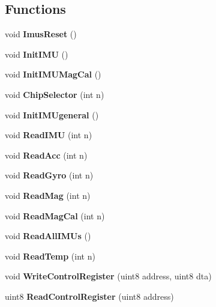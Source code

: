 \subsection*{Functions}
\begin{DoxyCompactItemize}
\item 
\mbox{\label{_i_m_u__functions_8c_a950a5a57e4188823c580d054ed2db16a}} 
void {\bfseries Imus\+Reset} ()
\item 
\mbox{\label{_i_m_u__functions_8c_ac4f81f61837e6a132dfceb5bb93b06fa}} 
void {\bfseries Init\+I\+MU} ()
\item 
\mbox{\label{_i_m_u__functions_8c_ac95975151b543b5265bc1e470aabf465}} 
void {\bfseries Init\+I\+M\+U\+Mag\+Cal} ()
\item 
\mbox{\label{_i_m_u__functions_8c_a3bb201c102e53b1b56398272fa105fbb}} 
void {\bfseries Chip\+Selector} (int n)
\item 
\mbox{\label{_i_m_u__functions_8c_a83f0630cb5ff556322c8cf56b6c6afc0}} 
void {\bfseries Init\+I\+M\+Ugeneral} ()
\item 
\mbox{\label{_i_m_u__functions_8c_a45df9ddb73de250cebfa02bf1d72bd97}} 
void {\bfseries Read\+I\+MU} (int n)
\item 
\mbox{\label{_i_m_u__functions_8c_a0290185f5b71ddb96ea13ce0a1ff48e7}} 
void {\bfseries Read\+Acc} (int n)
\item 
\mbox{\label{_i_m_u__functions_8c_ab8ae2a28912ce4a548b3603e86b22ae9}} 
void {\bfseries Read\+Gyro} (int n)
\item 
\mbox{\label{_i_m_u__functions_8c_a2ee29250f51422fa3d76df77335cce26}} 
void {\bfseries Read\+Mag} (int n)
\item 
\mbox{\label{_i_m_u__functions_8c_aad3b4856a76c623025484fe5b931bdd4}} 
void {\bfseries Read\+Mag\+Cal} (int n)
\item 
\mbox{\label{_i_m_u__functions_8c_a27bf3026dfe4cb0d6d255decc9944d71}} 
void {\bfseries Read\+All\+I\+M\+Us} ()
\item 
\mbox{\label{_i_m_u__functions_8c_ab0883cd12ebf2937fd6da478ac3ab976}} 
void {\bfseries Read\+Temp} (int n)
\item 
\mbox{\label{_i_m_u__functions_8c_af429837786eebd63058e26b3c86ac17a}} 
void \textbf{ Write\+Control\+Register} (uint8 address, uint8 dta)
\begin{DoxyCompactList}\small\item\em 

 \end{DoxyCompactList}\item 
\mbox{\label{_i_m_u__functions_8c_a209b21711f8765bb41e1823aab7b995b}} 
uint8 {\bfseries Read\+Control\+Register} (uint8 address)
\end{DoxyCompactItemize}
